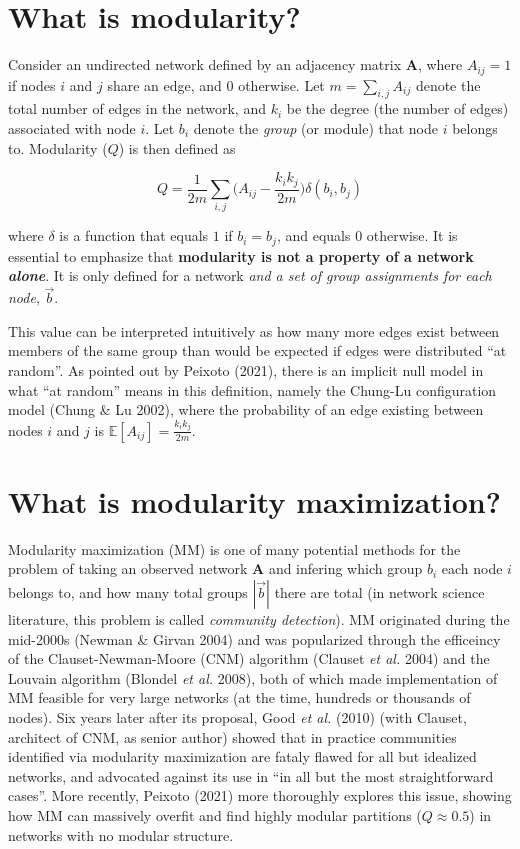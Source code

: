 \documentclass[
]{article}
\begin{document}
\hypertarget{what-is-modularity}{%
\section{What is modularity?}\label{what-is-modularity}}

Consider an undirected network defined by an adjacency matrix
\(\mathbf{A}\), where \(A_{ij} = 1\) if nodes \(i\) and \(j\) share an
edge, and \(0\) otherwise. Let \(m = \sum_{i,j} A_{ij}\) denote the
total number of edges in the network, and \(k_i\) be the degree (the
number of edges) associated with node \(i\). Let \(b_i\) denote the
\emph{group} (or module) that node \(i\) belongs to. Modularity (\(Q\))
is then defined as

\[Q = \frac{1}{2m} \sum_{i,j} \bigg( A_{ij} - \frac{k_i k_j}{2m}\bigg)
\delta(b_i, b_j)\]

where \(\delta\) is a function that equals \(1\) if \(b_i = b_j\), and
equals \(0\) otherwise. It is essential to emphasize that
\textbf{modularity is not a property of a network \emph{alone}}. It is
only defined for a network \emph{and a set of group assignments for each
node}, \(\vec{b}\).

This value can be interpreted intuitively as how many more edges exist
between members of the same group than would be expected if edges were
distributed ``at random''. As pointed out by Peixoto (2021), there is an
implicit null model in what ``at random'' means in this definition,
namely the Chung-Lu configuration model (Chung \& Lu 2002), where the
probability of an edge existing between nodes \(i\) and \(j\) is
\(\mathbb{E}[A_{ij}] = \frac{k_i k_j}{2m}\).

\hypertarget{what-is-modularity-maximization}{%
\section{What is modularity
maximization?}\label{what-is-modularity-maximization}}

Modularity maximization (MM) is one of many potential methods for the
problem of taking an observed network \(\mathbf{A}\) and infering which
group \(b_i\) each node \(i\) belongs to, and how many total groups
\(|\vec{b}|\) there are total (in network science literature, this
problem is called \emph{community detection}). MM originated during the
mid-2000s (Newman \& Girvan 2004) and was popularized through the
efficeincy of the Clauset-Newman-Moore (CNM) algorithm (Clauset \emph{et
al.} 2004) and the Louvain algorithm (Blondel \emph{et al.} 2008), both
of which made implementation of MM feasible for very large networks (at
the time, hundreds or thousands of nodes). Six years later after its
proposal, Good \emph{et al.} (2010) (with Clauset, architect of CNM, as
senior author) showed that in practice communities identified via
modularity maximization are fataly flawed for all but idealized
networks, and advocated against its use in ``in all but the most
straightforward cases''. More recently, Peixoto (2021) more thoroughly
explores this issue, showing how MM can massively overfit and find
highly modular partitions (\(Q \approx 0.5\)) in networks with no
modular structure.
\end{document}

